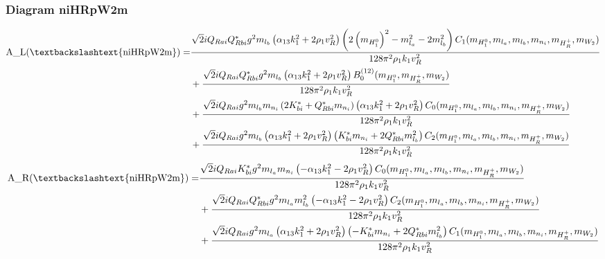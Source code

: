 \documentclass{article}
\begin{document}
\subsubsection{Diagram niHRpW2m}
\begin{align*}
\mathtt{\text{A\_L(\textbackslashtext\{niHRpW2m\})}} = & \frac{\sqrt{2} i Q_{Rai} Q_{Rbi}^* g^{2} m_{l_b} \left(\alpha_{13} k_{1}^{2} + 2 \rho_{1} v_{R}^{2}\right) \left(2 \left(m_{H_1^0}\right)^{2} - m_{l_a}^{2} - 2 m_{l_b}^{2}\right) C_1(m_{H_1^0}, m_{l_a}, m_{l_b}, m_{n_i}, m_{H_R^+}, m_{W_2})}{128 \pi^{2} \rho_{1} k_{1} v_{R}^{2}} \\
& + \frac{\sqrt{2} i Q_{Rai} Q_{Rbi}^* g^{2} m_{l_b} \left(\alpha_{13} k_{1}^{2} + 2 \rho_{1} v_{R}^{2}\right) B^{\left(12\right)}_0(m_{H_1^0}, m_{H_R^+}, m_{W_2})}{128 \pi^{2} \rho_{1} k_{1} v_{R}^{2}} \\
& + \frac{\sqrt{2} i Q_{Rai} g^{2} m_{l_b} m_{n_i} \left(2 K_{bi}^* + Q_{Rbi}^* m_{n_i}\right) \left(\alpha_{13} k_{1}^{2} + 2 \rho_{1} v_{R}^{2}\right) C_0(m_{H_1^0}, m_{l_a}, m_{l_b}, m_{n_i}, m_{H_R^+}, m_{W_2})}{128 \pi^{2} \rho_{1} k_{1} v_{R}^{2}} \\
& + \frac{\sqrt{2} i Q_{Rai} g^{2} m_{l_b} \left(\alpha_{13} k_{1}^{2} + 2 \rho_{1} v_{R}^{2}\right) \left(K_{bi}^* m_{n_i} + 2 Q_{Rbi}^* m_{l_b}^{2}\right) C_2(m_{H_1^0}, m_{l_a}, m_{l_b}, m_{n_i}, m_{H_R^+}, m_{W_2})}{128 \pi^{2} \rho_{1} k_{1} v_{R}^{2}} 
\end{align*}
\begin{align*}
\mathtt{\text{A\_R(\textbackslashtext\{niHRpW2m\})}} = & \frac{\sqrt{2} i Q_{Rai} K_{bi}^* g^{2} m_{l_a} m_{n_i} \left(- \alpha_{13} k_{1}^{2} - 2 \rho_{1} v_{R}^{2}\right) C_0(m_{H_1^0}, m_{l_a}, m_{l_b}, m_{n_i}, m_{H_R^+}, m_{W_2})}{128 \pi^{2} \rho_{1} k_{1} v_{R}^{2}} \\
& + \frac{\sqrt{2} i Q_{Rai} Q_{Rbi}^* g^{2} m_{l_a} m_{l_b}^{2} \left(- \alpha_{13} k_{1}^{2} - 2 \rho_{1} v_{R}^{2}\right) C_2(m_{H_1^0}, m_{l_a}, m_{l_b}, m_{n_i}, m_{H_R^+}, m_{W_2})}{128 \pi^{2} \rho_{1} k_{1} v_{R}^{2}} \\
& + \frac{\sqrt{2} i Q_{Rai} g^{2} m_{l_a} \left(\alpha_{13} k_{1}^{2} + 2 \rho_{1} v_{R}^{2}\right) \left(- K_{bi}^* m_{n_i} + 2 Q_{Rbi}^* m_{l_b}^{2}\right) C_1(m_{H_1^0}, m_{l_a}, m_{l_b}, m_{n_i}, m_{H_R^+}, m_{W_2})}{128 \pi^{2} \rho_{1} k_{1} v_{R}^{2}} 
\end{align*}
\end{document}
